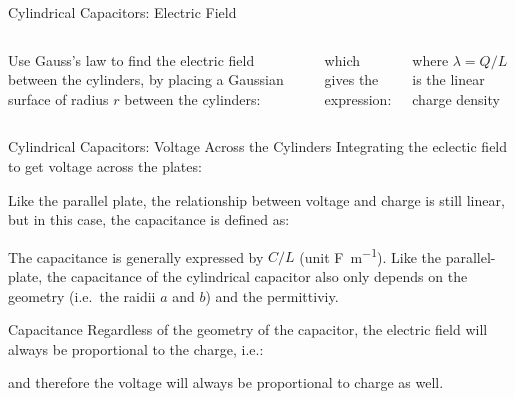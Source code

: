 \documentclass[12pt,aspectratio=169]{beamer}
\begin{document}
\begin{frame}{Cylindrical Capacitors: Electric Field}
  \begin{columns}

    Use Gauss's law to find the electric field between the cylinders, by placing
    a Gaussian surface of radius $r$ between the cylinders: 

    
    which gives the expression:

    where $\lambda=Q/L$ is the linear charge density
  \end{columns}
\end{frame}




\begin{frame}{Cylindrical Capacitors: Voltage Across the Cylinders}
  Integrating the eclectic field to get voltage across the plates:


  Like the parallel plate, the relationship between voltage and charge is still
  linear, but in this case, the capacitance is defined as:


  The capacitance is generally expressed by $C/L$ (unit \si{\farad\per\metre}).
  Like the parallel-plate, the capacitance of the cylindrical capacitor also
  only depends on the geometry (i.e.\ the raidii $a$ and $b$) and the
  permittiviy.
\end{frame}


\begin{frame}{Capacitance}
  Regardless of the geometry of the capacitor, the electric field will always
  be proportional to the charge, i.e.:


  and therefore the voltage will always be proportional to charge as well.
\end{frame}
\end{document}
